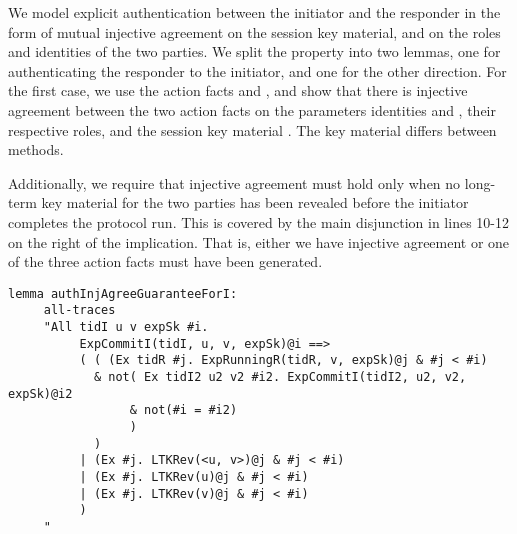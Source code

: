 We model explicit authentication between the initiator and the
responder in the form of mutual injective agreement on the session key material,
and on the roles and identities of the two parties.
%
We split the property into two lemmas, one for authenticating the responder to the
initiator, and one for the other direction.
%
For the first case, we use the action facts  and
, and show that there is injective agreement
between the two action facts on the parameters identities  and ,
their respective roles,  and the session key material .
%
The key material differs between \mEdhoc{} methods.
%

Additionally, we require that injective agreement must hold only when
no long-term key material for the two parties has been revealed before
the initiator completes the protocol run.
%
This is covered by the main disjunction in lines 10-12 on the right of
the implication.
%
That is, either we have injective agreement or one of
the three  action facts must have been generated.
%


\begin{lstlisting}
lemma authInjAgreeGuaranteeForI:
     all-traces
     "All tidI u v expSk #i.
          ExpCommitI(tidI, u, v, expSk)@i ==>
          ( ( (Ex tidR #j. ExpRunningR(tidR, v, expSk)@j & #j < #i)
            & not( Ex tidI2 u2 v2 #i2. ExpCommitI(tidI2, u2, v2, expSk)@i2
                 & not(#i = #i2)
                 )
            )
          | (Ex #j. LTKRev(<u, v>)@j & #j < #i)
          | (Ex #j. LTKRev(u)@j & #j < #i)
          | (Ex #j. LTKRev(v)@j & #j < #i)
          )
     "
\end{lstlisting}

